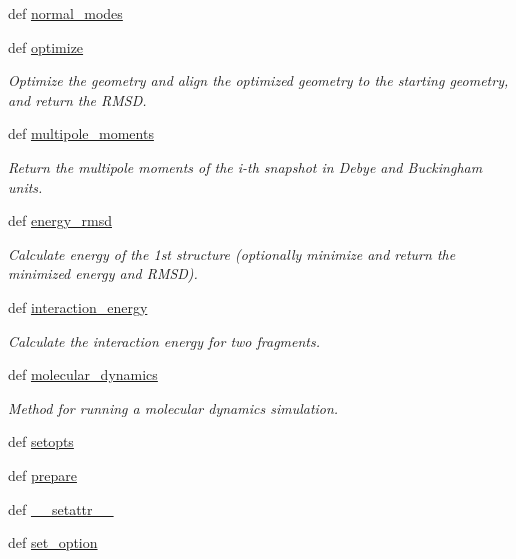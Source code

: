 \begin{DoxyCompactItemize}
def \hyperlink{classforcebalance_1_1openmmio_1_1OpenMM_acb870d944524e38d6d8c5a1b89a76c53}{normal\-\_\-modes}
\item 
def \hyperlink{classforcebalance_1_1openmmio_1_1OpenMM_a89b5d622f3f99e64eef752c2b3a89af6}{optimize}
\begin{DoxyCompactList}\small\item\em Optimize the geometry and align the optimized geometry to the starting geometry, and return the R\-M\-S\-D. \end{DoxyCompactList}\item 
def \hyperlink{classforcebalance_1_1openmmio_1_1OpenMM_ab70b80d92c6aca334e7777ca436f8198}{multipole\-\_\-moments}
\begin{DoxyCompactList}\small\item\em Return the multipole moments of the i-\/th snapshot in Debye and Buckingham units. \end{DoxyCompactList}\item 
def \hyperlink{classforcebalance_1_1openmmio_1_1OpenMM_a30085d1fe84ab05a7670c3c6dce1527b}{energy\-\_\-rmsd}
\begin{DoxyCompactList}\small\item\em Calculate energy of the 1st structure (optionally minimize and return the minimized energy and R\-M\-S\-D). \end{DoxyCompactList}\item 
def \hyperlink{classforcebalance_1_1openmmio_1_1OpenMM_a4f81b8441da055c3a743a8fbbc55752c}{interaction\-\_\-energy}
\begin{DoxyCompactList}\small\item\em Calculate the interaction energy for two fragments. \end{DoxyCompactList}\item 
def \hyperlink{classforcebalance_1_1openmmio_1_1OpenMM_a929078aa643120a3b32349aac44aa556}{molecular\-\_\-dynamics}
\begin{DoxyCompactList}\small\item\em Method for running a molecular dynamics simulation. \end{DoxyCompactList}\item 
def \hyperlink{classforcebalance_1_1engine_1_1Engine_ab018e2b35eeab6b4aeae7f53582e736d}{setopts}
\item 
def \hyperlink{classforcebalance_1_1engine_1_1Engine_a2eab57877002b41dc3742f0c67f2f24e}{prepare}
\item 
def \hyperlink{classforcebalance_1_1BaseClass_a0c851d413c3b2f30561b72a46771bcff}{\-\_\-\-\_\-setattr\-\_\-\-\_\-}
\item 
def \hyperlink{classforcebalance_1_1BaseClass_a73e9a37a7632e79eb99f49bd15aced45}{set\-\_\-option}
\end{DoxyCompactItemize}

